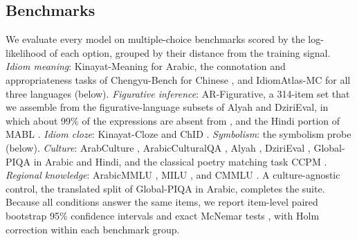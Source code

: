 \subsection{Benchmarks}
\label{sec:exp-benchmarks}

We evaluate every model on multiple-choice benchmarks scored by the log-likelihood of each option, grouped by their distance from the training signal.
\textit{Idiom meaning}: Kinayat-Meaning for Arabic, the connotation and appropriateness tasks of Chengyu-Bench for Chinese \citep{attia2026pragmatic,chengyubench2025}, and IdiomAtlas-MC for all three languages (below).
\textit{Figurative inference}: AR-Figurative, a 314-item set that we assemble from the figurative-language subsets of Alyah and DziriEval, in which about 99\% of the expressions are absent from \dataname{}, and the Hindi portion of MABL \citep{kabra2023multi}.
\textit{Idiom cloze}: Kinayat-Cloze and ChID \citep{zheng2019chid}.
\textit{Symbolism}: the symbolism probe (below).
\textit{Culture}: ArabCulture \citep{sadallah2025arabculture}, ArabicCulturalQA \citep{arabicculturalqa2025}, Alyah \citep[Emirati culture;][]{alyah2025}, DziriEval \citep[Algerian culture;][]{dzirieval2025}, Global-PIQA \citep{chang2025global} in Arabic and Hindi, and the classical poetry matching task CCPM \citep{li2021ccpm}.
\textit{Regional knowledge}: ArabicMMLU \citep{koto2024arabicmmlu}, MILU \citep{verma2025milu}, and CMMLU \citep{li2023cmmlu}.
A culture-agnostic control, the translated split of Global-PIQA in Arabic, completes the suite.
Because all conditions answer the same items, we report item-level paired bootstrap 95\% confidence intervals and exact McNemar tests \citep{dror2018hitchhiker}, with Holm correction \citep{holm1979simple} within each benchmark group.

